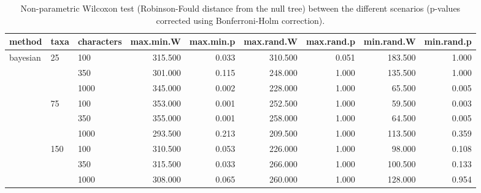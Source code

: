 \begin{table}[ht]
\centering
\begin{tabular}{lllrrrrrr}
  \hline
method & taxa & characters & max.min.W & max.min.p & max.rand.W & max.rand.p & min.rand.W & min.rand.p \\ 
  \hline
bayesian & 25 & 100 & 315.500 & 0.033 & 310.500 & 0.051 & 183.500 & 1.000 \\ 
   &  & 350 & 301.000 & 0.115 & 248.000 & 1.000 & 135.500 & 1.000 \\ 
   &  & 1000 & 345.000 & 0.002 & 228.000 & 1.000 & 65.500 & 0.005 \\ 
   & 75 & 100 & 353.000 & 0.001 & 252.500 & 1.000 & 59.500 & 0.003 \\ 
   &  & 350 & 355.000 & 0.001 & 258.000 & 1.000 & 64.500 & 0.005 \\ 
   &  & 1000 & 293.500 & 0.213 & 209.500 & 1.000 & 113.500 & 0.359 \\ 
   & 150 & 100 & 310.500 & 0.053 & 226.000 & 1.000 & 98.000 & 0.108 \\ 
   &  & 350 & 315.500 & 0.033 & 266.000 & 1.000 & 100.500 & 0.133 \\ 
   &  & 1000 & 308.000 & 0.065 & 260.000 & 1.000 & 128.000 & 0.954 \\ 
   \hline
\end{tabular}
\caption{Non-parametric Wilcoxon test (Robinson-Fould distance from the null tree) between the different scenarios (p-values corrected using Bonferroni-Holm correction).} 
\label{Full_Tab_Bayesian_WXRFnull}
\end{table}
